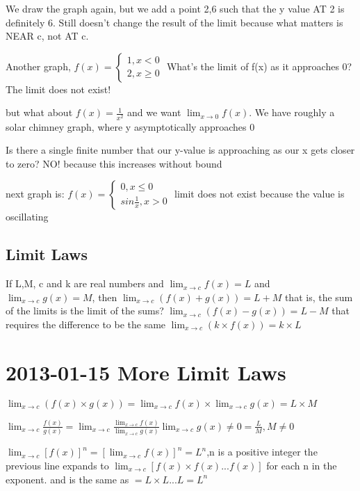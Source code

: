 \documentclass[12pt]{article}
\begin{document}
We draw the graph again, but we add a point 2,6 such that the y value AT 2 is definitely 6. Still doesn't
change the result of the limit because what matters is NEAR c, not AT c.

Another graph,
$f(x) = \left\{ \begin{array}{l}
1, x < 0\\
2, x \geq 0 \end{array} \right. $
What's the limit of f(x) as it approaches 0? The limit does not exist!

but what about $f(x) = \frac{1}{x^2}$ and we want $\lim_{x \to 0} f(x)$.
We have roughly a solar chimney graph, where y asymptotically approaches 0

Is there a single finite number that our y-value is approaching as our x gets closer to zero? NO!
because this increases without bound

next graph is: $f(x) = \left\{\begin{array}{l}
0,x \leq 0\\
sin \frac{1}{x}, x > 0
\end{array} \right. $
limit does not exist because the value is oscillating

\subsection{Limit Laws}
If L,M, c and k are real numbers and
$\lim_{x \to c} f(x) = L$ and $\lim_{x \to c} g(x) = M$, then
$\lim_{x \to c}(f(x) + g(x)) = L+M$
that is, the sum of the limits is the limit of the sums?
$\lim_{x \to c}(f(x) - g(x)) = L-M$
that requires the difference to be the same
$\lim_{x \to c}( k \times f(x)) = k \times L$

\section{2013-01-15 More Limit Laws}

$\lim_{x \to c}(f(x) \times g(x)) = \lim_{x \to c}f(x) \times \lim_{x \to c}g(x) = L \times M$

$\lim_{x \to c} \frac{f(x)}{g(x)} = \lim_{x \to c} \frac{\lim_{x \to c} f(x)}{\lim_{x \to c} g(x)} \lim_{x \to
  c}g(x) \neq 0 = \frac{L}{M},M \neq 0$

$\lim_{x \to c}[f(x)]^n = [\lim_{x \to c}f(x)]^n = L^n$,n is a positive integer
the previous line expands to $\lim_{x \to c}[f(x) \times f(x) ... f(x)]$ for each n in the exponent.
and is the same as $=L \times L ... L = L^n$
\end{document}
